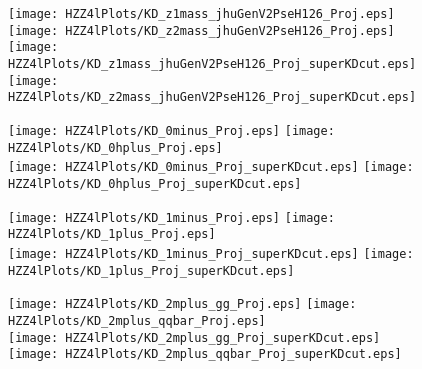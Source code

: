 \begin{figure}
\begin{center}
\texttt{[image: HZZ4lPlots/KD\_z1mass\_jhuGenV2PseH126\_Proj.eps]}
\texttt{[image: HZZ4lPlots/KD\_z2mass\_jhuGenV2PseH126\_Proj.eps]}\\
\texttt{[image: HZZ4lPlots/KD\_z1mass\_jhuGenV2PseH126\_Proj\_superKDcut.eps]}
\texttt{[image: HZZ4lPlots/KD\_z2mass\_jhuGenV2PseH126\_Proj\_superKDcut.eps]}
\label{fig:HZZ4lmassesKD}
\caption{}
\end{center}
\end{figure}


\begin{figure}
\begin{center}
\texttt{[image: HZZ4lPlots/KD\_0minus\_Proj.eps]}
\texttt{[image: HZZ4lPlots/KD\_0hplus\_Proj.eps]}\\
\texttt{[image: HZZ4lPlots/KD\_0minus\_Proj\_superKDcut.eps]}
\texttt{[image: HZZ4lPlots/KD\_0hplus\_Proj\_superKDcut.eps]}
\label{fig:HZZ4lspin-0KD}
\caption{}
\end{center}
\end{figure}

\begin{figure}
\begin{center}
\texttt{[image: HZZ4lPlots/KD\_1minus\_Proj.eps]}
\texttt{[image: HZZ4lPlots/KD\_1plus\_Proj.eps]}\\
\texttt{[image: HZZ4lPlots/KD\_1minus\_Proj\_superKDcut.eps]}
\texttt{[image: HZZ4lPlots/KD\_1plus\_Proj\_superKDcut.eps]}
\label{fig:HZZ4lspin-1KD}
\caption{}
\end{center}
\end{figure}

\begin{figure}
\begin{center}
\texttt{[image: HZZ4lPlots/KD\_2mplus\_gg\_Proj.eps]}
\texttt{[image: HZZ4lPlots/KD\_2mplus\_qqbar\_Proj.eps]}\\
\texttt{[image: HZZ4lPlots/KD\_2mplus\_gg\_Proj\_superKDcut.eps]}
\texttt{[image: HZZ4lPlots/KD\_2mplus\_qqbar\_Proj\_superKDcut.eps]}
\label{fig:HZZ4lspin-2KD}
\caption{}
\end{center}
\end{figure}



